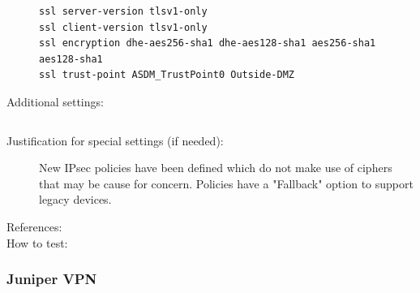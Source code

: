 \begin{description}
\begin{lstlisting}[breaklines]
ssl server-version tlsv1-only
ssl client-version tlsv1-only
ssl encryption dhe-aes256-sha1 dhe-aes128-sha1 aes256-sha1 aes128-sha1
ssl trust-point ASDM_TrustPoint0 Outside-DMZ
\end{lstlisting}

\item[Additional settings:] \mbox{}


\begin{lstlisting}[breaklines]
    %copy \& paste additional settings
\end{lstlisting}

\item[Justification for special settings (if needed):] \mbox{}
New IPsec policies have been defined which do not make use of ciphers that may be cause for concern. Policies have a "Fallback" option to support legacy devices.


\item[References:] 


\item[How to test:] 

\end{description}







\subsubsection{Juniper VPN}


